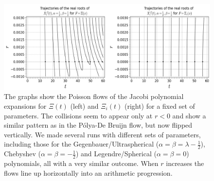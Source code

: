 \documentclass[a4paper,11pt,twoside]{amsart}
\begin{document}
\begin{small}
{\begin{minipage}{\textwidth}
\end{minipage}}
\begin{figure}[H]
  \includegraphics[width=1\linewidth]{JacobiFlowdouble.jpeg}
  \caption{The graphs show the Poisson flows of the Jacobi polynomial expansions for $\Xi(t)$ (left) and $\Xi_i(t)$ (right) for a fixed set of parameters. The collisions seem to appear only at $r < 0$ and show a similar pattern as in the Pólya-De Bruijn flow, but now flipped vertically. We made several runs with different sets of parameters, including those for the Gegenbauer/Ultraspherical ($\alpha=\beta=\lambda-\frac12$), Chebyshev ($\alpha=\beta=-\frac12$) and Legendre/Spherical ($\alpha=\beta=0$) polynomials, all with a very similar outcome. When $r$ increases the flows line up horizontally into an arithmetic progression.}
  \label{fig:flowJ}
\end{figure}
\pagebreak
\noindent{}
\end{small}
\end{document}
